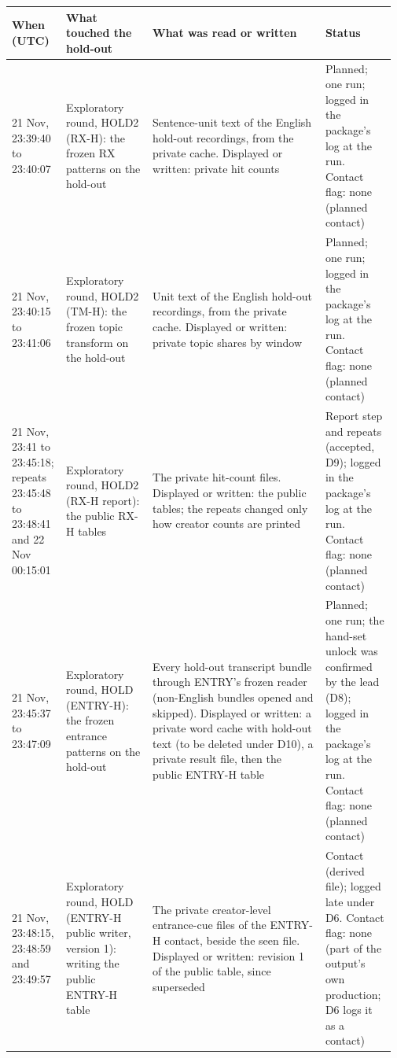 {\scriptsize\setlength{\tabcolsep}{2pt}
\begin{tabular}{@{}p{0.13\linewidth}p{0.22\linewidth}p{0.44\linewidth}p{0.18\linewidth}@{}}
\toprule
When (UTC) & What touched the hold-out & What was read or written & Status \\
\midrule
21 Nov, 23:39:40 to 23:40:07 & Exploratory round, HOLD2 (RX-H): the frozen RX patterns on the hold-out & Sentence-unit text of the English hold-out recordings, from the private cache. Displayed or written: private hit counts & Planned; one run; logged in the package's log at the run. Contact flag: none (planned contact) \\
21 Nov, 23:40:15 to 23:41:06 & Exploratory round, HOLD2 (TM-H): the frozen topic transform on the hold-out & Unit text of the English hold-out recordings, from the private cache. Displayed or written: private topic shares by window & Planned; one run; logged in the package's log at the run. Contact flag: none (planned contact) \\
21 Nov, 23:41 to 23:45:18; repeats 23:45:48 to 23:48:41 and 22 Nov 00:15:01 & Exploratory round, HOLD2 (RX-H report): the public RX-H tables & The private hit-count files. Displayed or written: the public tables; the repeats changed only how creator counts are printed & Report step and repeats (accepted, D9); logged in the package's log at the run. Contact flag: none (planned contact) \\
21 Nov, 23:45:37 to 23:47:09 & Exploratory round, HOLD (ENTRY-H): the frozen entrance patterns on the hold-out & Every hold-out transcript bundle through ENTRY's frozen reader (non-English bundles opened and skipped). Displayed or written: a private word cache with hold-out text (to be deleted under D10), a private result file, then the public ENTRY-H table & Planned; one run; the hand-set unlock was confirmed by the lead (D8); logged in the package's log at the run. Contact flag: none (planned contact) \\
21 Nov, 23:48:15, 23:48:59 and 23:49:57 & Exploratory round, HOLD (ENTRY-H public writer, version 1): writing the public ENTRY-H table & The private creator-level entrance-cue files of the ENTRY-H contact, beside the seen file. Displayed or written: revision 1 of the public table, since superseded & Contact (derived file); logged late under D6. Contact flag: none (part of the output's own production; D6 logs it as a contact) \\

\end{tabular}}
